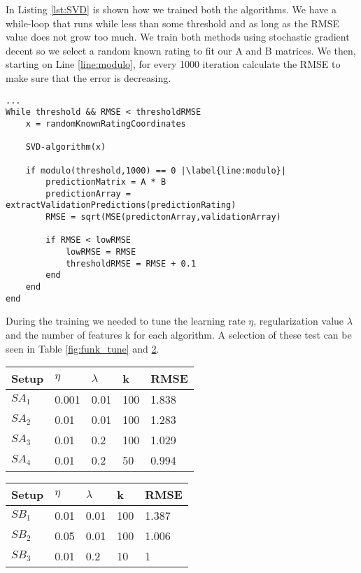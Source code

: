 In Listing \ref{lst:SVD} is shown how we trained both the algorithms. We have a while-loop that runs while less than some threshold and as long as the RMSE value does not grow too much.  
We train both methods using stochastic gradient decent so we select a random known rating to fit our A and B matrices. We then, starting on Line \ref{line:modulo}, for every 1000 iteration calculate the RMSE to make sure that the error is decreasing. 

\begin{lstlisting}[caption={Training of the prediction matrix},label=lst:SVD,escapechar=|]
...
While threshold && RMSE < thresholdRMSE
	x = randomKnownRatingCoordinates
	
	SVD-algorithm(x)
	
	if modulo(threshold,1000) == 0 |\label{line:modulo}|
		predictionMatrix = A * B
		predictionArray = extractValidationPredictions(predictionRating)
		RMSE = sqrt(MSE(predictonArray,validationArray)	
		
		if RMSE < lowRMSE 
			lowRMSE = RMSE 
			thresholdRMSE = RMSE + 0.1
		end
	end
end
\end{lstlisting}

During the training we needed to tune the learning rate $\eta$, regularization value $\lambda$ and the number of features k for each algorithm. A selection of these test can be seen in Table \ref{fig:funk_tune} and \ref{fig:SVD_tune}.
\begin{table}[h]
\centering
\begin{minipage}{.48\textwidth}\centering
\begin{tabular}{|l|llll|}
\hline
Setup	& $\eta$ & $\lambda$ & k   & RMSE   \\ \hline
$SA_1$	& 0.001  & 0.01      & 100 & 1.838 \\ \hline
$SA_2$	& 0.01   & 0.01      & 100 & 1.283 \\ \hline
$SA_3$	& 0.01   & 0.2       & 100 & 1.029 \\ \hline
$SA_4$	& 0.01   & 0.2		 & 50  & 0.994 \\ \hline
\end{tabular}
\label{fig:funk_tune}
\end{minipage}
\hfill
\begin{minipage}{.48\textwidth}\centering
\begin{tabular}{|l|llll|}
\hline
Setup	& $\eta$ & $\lambda$ & k   & RMSE \\ \hline
$SB_1$	& 0.01   & 0.01   & 100 & 1.387   \\ \hline
$SB_2$	& 0.05   & 0.01   & 100 & 1.006  \\ \hline
$SB_3$	& 0.01   & 0.2    & 10 	& 1		  \\ \hline
\end{tabular}
\label{fig:SVD_tune}
\end{minipage}
\end{table}

